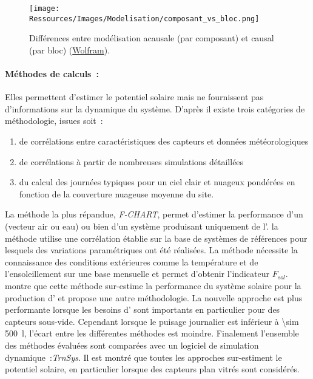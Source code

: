 \begin{figure}
    \centering
    \texttt{[image: Ressources/Images/Modelisation/composant\_vs\_bloc.png]}
    \caption[Différences entre modélisation acausale et causal]
            {Différences entre modélisation acausale (par composant) et causal (par bloc)
             (\href{http://www.wolfram.com/system-modeler/}{Wolfram}).}
    \label{fig:acausal_vs_causal}
\end{figure}

\paragraph{Méthodes de calculs~:} %
\label{par:methodes_de_calculs}
Elles permettent d’estimer le potentiel solaire mais ne fournissent pas d’informations sur
la dynamique du système. D’après \textcite{Duffie1980} il existe trois catégories de
méthodologie, issues soit~:
\begin{enumerate}
    \item de corrélations entre caractéristiques des capteurs et
          données météorologiques
    \item de corrélations à partir de nombreuses simulations détaillées
    \item du calcul des journées typiques pour un ciel clair et nuageux
          pondérées en fonction de la couverture nuageuse moyenne du site.
\end{enumerate}
La méthode la plus répandue, \textit{F-CHART}, permet d’estimer la performance
d’un  (vecteur air ou eau) ou bien d’un système produisant uniquement de
l’. la méthode utilise une corrélation établie sur la base de systèmes de
références pour lesquels des variations paramétriques ont été réalisées. La méthode
nécessite la connaissance des conditions extérieures comme la température et de l’ensoleillement
sur une base mensuelle et permet d’obtenir l’indicateur $F_{sol}$. \textcite{Cuadros200796} montre que cette
méthode sur-estime la performance du système solaire pour la production d’ et
propose une autre méthodologie. La nouvelle approche est plus performante lorsque les
besoins d’ sont importants en particulier pour des capteurs sous-vide. Cependant
lorsque le puisage journalier est inférieur à \SI{\sim 500}{\litre}, l’écart entre les
différentes méthodes est moindre. Finalement l’ensemble des méthodes évaluées sont
comparées avec un logiciel de simulation dynamique~:\textit{TrnSys}. Il est montré que
toutes les approches sur-estiment le potentiel solaire, en particulier lorsque des
capteurs plan vitrés sont considérés.

